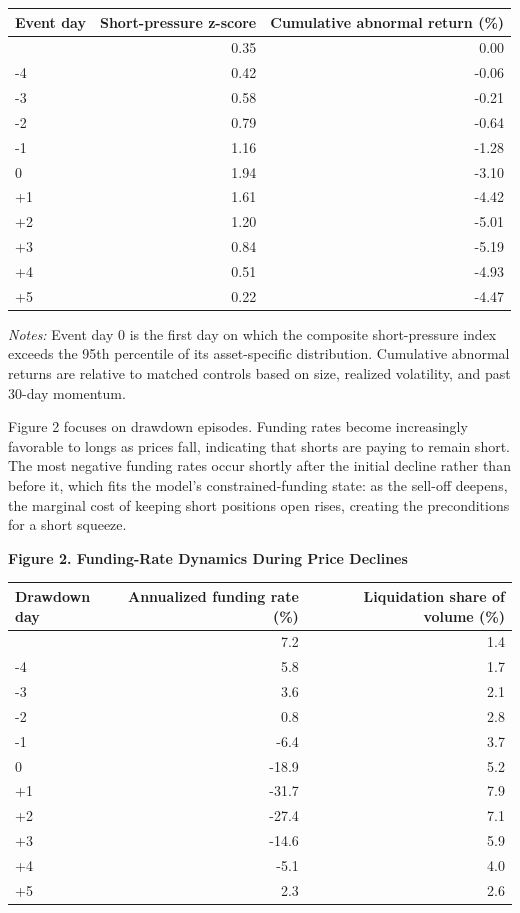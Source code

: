 \documentclass[
]{article}
\newcounter{none} %
\begin{document}
{\def\LTcaptype{none} %
\begin{longtable}[]{@{}lrr@{}}
\toprule\noalign{}
Event day & Short-pressure z-score & Cumulative abnormal return (\%) \\
\midrule\noalign{}
\endhead
\bottomrule\noalign{}
\endlastfoot
-5 & 0.35 & 0.00 \\
-4 & 0.42 & -0.06 \\
-3 & 0.58 & -0.21 \\
-2 & 0.79 & -0.64 \\
-1 & 1.16 & -1.28 \\
0 & 1.94 & -3.10 \\
+1 & 1.61 & -4.42 \\
+2 & 1.20 & -5.01 \\
+3 & 0.84 & -5.19 \\
+4 & 0.51 & -4.93 \\
+5 & 0.22 & -4.47 \\
\end{longtable}
}

\emph{Notes:} Event day 0 is the first day on which the composite
short-pressure index exceeds the 95th percentile of its asset-specific
distribution. Cumulative abnormal returns are relative to matched
controls based on size, realized volatility, and past 30-day momentum.

Figure 2 focuses on drawdown episodes. Funding rates become increasingly
favorable to longs as prices fall, indicating that shorts are paying to
remain short. The most negative funding rates occur shortly after the
initial decline rather than before it, which fits the model's
constrained-funding state: as the sell-off deepens, the marginal cost of
keeping short positions open rises, creating the preconditions for a
short squeeze.

\textbf{Figure 2. Funding-Rate Dynamics During Price Declines}

{\def\LTcaptype{none} %
\begin{longtable}[]{@{}lrr@{}}
\toprule\noalign{}
Drawdown day & Annualized funding rate (\%) & Liquidation share of
volume (\%) \\
\midrule\noalign{}
\endhead
\bottomrule\noalign{}
\endlastfoot
-5 & 7.2 & 1.4 \\
-4 & 5.8 & 1.7 \\
-3 & 3.6 & 2.1 \\
-2 & 0.8 & 2.8 \\
-1 & -6.4 & 3.7 \\
0 & -18.9 & 5.2 \\
+1 & -31.7 & 7.9 \\
+2 & -27.4 & 7.1 \\
+3 & -14.6 & 5.9 \\
+4 & -5.1 & 4.0 \\
+5 & 2.3 & 2.6 \\
\end{longtable}
}
\end{document}
